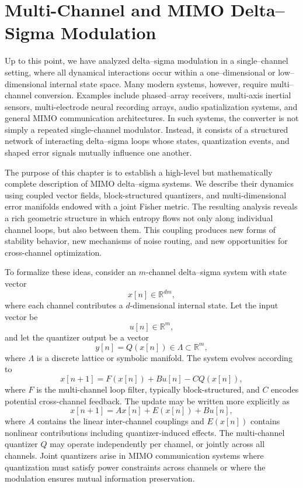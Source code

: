 
\chapter{Multi-Channel and MIMO Delta--Sigma Modulation}

Up to this point, we have analyzed delta--sigma modulation in a single–channel setting, where all dynamical interactions occur within a one–dimensional or low–dimensional internal state space. Many modern systems, however, require multi–channel conversion. Examples include phased–array receivers, multi-axis inertial sensors, multi-electrode neural recording arrays, audio spatialization systems, and general MIMO communication architectures. In such systems, the converter is not simply a repeated single-channel modulator. Instead, it consists of a structured network of interacting delta--sigma loops whose states, quantization events, and shaped error signals mutually influence one another.

The purpose of this chapter is to establish a high-level but mathematically complete description of MIMO delta--sigma systems. We describe their dynamics using coupled vector fields, block-structured quantizers, and multi-dimensional error manifolds endowed with a joint Fisher metric. The resulting analysis reveals a rich geometric structure in which entropy flows not only along individual channel loops, but also between them. This coupling produces new forms of stability behavior, new mechanisms of noise routing, and new opportunities for cross-channel optimization.

To formalize these ideas, consider an \(m\)-channel delta--sigma system with state vector
\[
x[n] \in \mathbb{R}^{d m},
\]
where each channel contributes a \(d\)-dimensional internal state. Let the input vector be
\[
u[n] \in \mathbb{R}^{m},
\]
and let the quantizer output be a vector
\[
y[n] = Q(x[n]) \in \Lambda \subset \mathbb{R}^{m},
\]
where \(\Lambda\) is a discrete lattice or symbolic manifold. The system evolves according to
\[
x[n+1] = F(x[n]) + B u[n] - C Q(x[n]),
\]
where \(F\) is the multi-channel loop filter, typically block-structured, and \(C\) encodes potential cross-channel feedback. The update may be written more explicitly as
\[
x[n+1] = A x[n] + E(x[n]) + B u[n],
\]
where \(A\) contains the linear inter-channel couplings and \(E(x[n])\) contains nonlinear contributions including quantizer-induced effects. The multi-channel quantizer \(Q\) may operate independently per channel, or jointly across all channels. Joint quantizers arise in MIMO communication systems where quantization must satisfy power constraints across channels or where the modulation ensures mutual information preservation.

